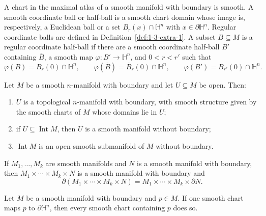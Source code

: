 \begin{definition}
\label{def:1-6-extra-3}




A chart in the maximal atlas of a smooth manifold with boundary is smooth.
A smooth coordinate ball or half-ball is a smooth chart domain whose image is,
respectively, a Euclidean ball or a set $B_r(x)\cap\mathbb H^n$ with
$x\in\partial\mathbb H^n$. Regular coordinate balls are defined in
Definition~\ref{def:1-3-extra-1}. A subset $B\subseteq M$ is a regular
coordinate half-ball if there are a smooth coordinate half-ball $B'$
containing $\overline B$, a smooth map $\varphi:B'\to\mathbb H^n$, and
$0<r<r'$ such that
\[
\varphi(B)=B_r(0)\cap\mathbb H^n,\qquad
\varphi(\overline B)=\overline B_r(0)\cap\mathbb H^n,\qquad
\varphi(B')=B_{r'}(0)\cap\mathbb H^n.
\]
\end{definition}

\begin{proposition}
\label{exer:1-44}




Let $M$ be a smooth $n$-manifold with boundary and let $U\subseteq M$ be open.
Then:
\begin{enumerate}
\item $U$ is a topological $n$-manifold with boundary, with smooth structure
given by the smooth charts of $M$ whose domains lie in $U$;
\item if $U\subseteq\operatorname{Int}M$, then $U$ is a smooth manifold
without boundary;
\item $\operatorname{Int}M$ is an open smooth submanifold of $M$ without
boundary.
\end{enumerate}
\end{proposition}

\begin{proposition}
\label{prop:1-45}



If $M_1,\ldots,M_k$ are smooth manifolds and $N$ is a smooth manifold with
boundary, then $M_1\times\cdots\times M_k\times N$ is a smooth manifold with
boundary and
\[
\partial(M_1\times\cdots\times M_k\times N)
=M_1\times\cdots\times M_k\times\partial N.
\]
\end{proposition}

\begin{theorem}
\label{thm:1-46}




Let $M$ be a smooth manifold with boundary and $p\in M$. If one smooth chart
maps $p$ to $\partial\mathbb H^n$, then every smooth chart containing $p$ does
so.
\end{theorem}

